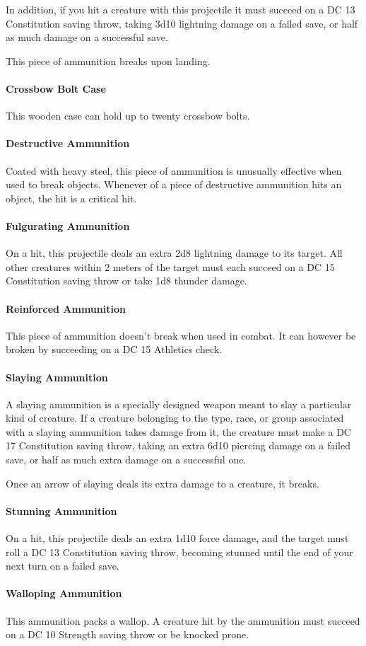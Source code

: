     In addition, if you hit a creature with this projectile it must succeed on a DC 13 Constitution saving throw, taking 3d10 lightning damage on a failed save, or half as much damage on a successful save.

    This piece of ammunition breaks upon landing.
\paragraph{Crossbow Bolt Case}
    This wooden case can hold up to twenty crossbow bolts.
\paragraph{Destructive Ammunition}
    Coated with heavy steel, this piece of ammunition is unusually effective when used to break objects.
    Whenever of a piece of destructive ammunition hits an object, the hit is a critical hit.
\paragraph{Fulgurating Ammunition}
    On a hit, this projectile deals an extra 2d8 lightning damage to its target.
    All other creatures within 2 meters of the target must each succeed on a DC 15 Constitution saving throw or take 1d8 thunder damage.
\paragraph{Reinforced Ammunition}
    This piece of ammunition doesn't break when used in combat.
    It can however be broken by succeeding on a DC 15 Athletics check.
\paragraph{Slaying Ammunition}
    A slaying ammunition is a specially designed weapon meant to slay a particular kind of creature.
    If a creature belonging to the type, race, or group associated with a slaying ammunition takes damage from it, the creature must make a DC 17 Constitution saving throw, taking an extra 6d10 piercing damage on a failed save, or half as much extra damage on a successful one.

    Once an arrow of slaying deals its extra damage to a creature, it breaks.
\paragraph{Stunning Ammunition}
    On a hit, this projectile deals an extra 1d10 force damage, and the target must roll a DC 13 Constitution saving throw, becoming stunned until the end of your next turn on a failed save.
\paragraph{Walloping Ammunition}
    This ammunition packs a wallop.
    A creature hit by the ammunition must succeed on a DC 10 Strength saving throw or be knocked prone.
\pagebreak

